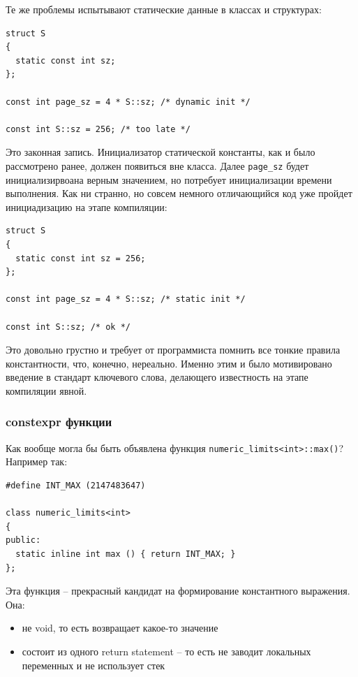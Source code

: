 \documentclass[a4paper,12pt,oneside]{article}
\begin{document}
Те же проблемы испытывают статические данные в классах и структурах:

\begin{lstlisting}
struct S 
{
  static const int sz;
};

const int page_sz = 4 * S::sz; /* dynamic init */

const int S::sz = 256; /* too late */
\end{lstlisting}

Это законная запись. Инициализатор статической константы, как и было рассмотрено ранее, должен появиться вне класса. Далее \lstinline!page_sz! будет инициализирвоана верным значением, но потребует инициализации времени выполнения. Как ни странно, но совсем немного отличающийся код уже пройдет инициадизацию на этапе компиляции:

\begin{lstlisting}
struct S 
{
  static const int sz = 256;
};

const int page_sz = 4 * S::sz; /* static init */

const int S::sz; /* ok */
\end{lstlisting}

Это довольно грустно и требует от программиста помнить все тонкие правила константности, что, конечно, нереально. Именно этим и было мотивировано введение в стандарт ключевого слова, делающего известность на этапе компиляции явной.

\subsubsection{constexpr функции}

Как вообще могла бы быть объявлена функция \lstinline!numeric_limits<int>::max()!? Например так:

\begin{lstlisting}
#define INT_MAX (2147483647)

class numeric_limits<int>
{
public:
  static inline int max () { return INT_MAX; }
};
\end{lstlisting}

Эта функция -- прекрасный кандидат на формирование константного выражения. Она:
\begin{itemize}
\item не void, то есть возвращает какое-то значение
\item состоит из одного return statement -- то есть не заводит локальных переменных и не использует стек
\end{itemize}
\end{document}
